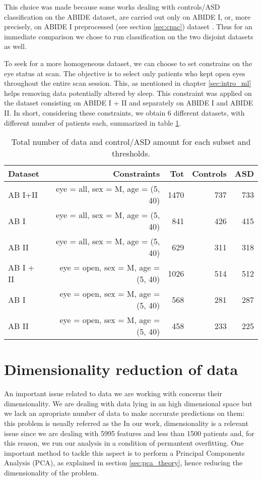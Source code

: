 \documentclass[11pt]{report}
\begin{document}
This choice was made because some works dealing with controls/ASD classification on the ABIDE dataset, are carried out only on ABIDE I, or, more precisely, on ABIDE I preprocessed (see section \ref{sec:cpac}) dataset \cite{spera-2019}. 
Thus for an immediate comparison we chose to run classification on the two disjoint datasets as well.

To seek for a more homogeneous dataset, we can choose to set constrains on the eye status at scan.
The objective is to select only patients who kept open eyes throughout the entire scan session.
This, as mentioned in chapter \ref{sec:intro_ml} helps removing data potentially altered by sleep.
This constraint was applied on the dataset consisting on ABIDE I + II and separately on ABIDE I and ABIDE II.
In short, considering these constraints, we obtain 6 different datasets, with different number of patients each, summarized in table \ref{tab:controlASD_per_subset}.




\begin{table}[!htp]\centering
\scriptsize
\begin{tabular}{lrrrr}\toprule
Dataset &Constraints &Tot &Controls &ASD \\\midrule
AB I+II &eye = all, sex = M, age = (5, 40) &1470 &737 &733 \\
AB I& eye = all, sex = M, age = (5, 40)&841 &426 &415 \\
AB II&eye = all, sex = M, age = (5, 40) &629 &311 &318 \\
AB I + II &eye = open, sex = M, age = (5, 40) &1026 &514 &512 \\
AB I& eye = open, sex = M, age = (5, 40) &568 &281 &287 \\
AB II &eye = open, sex = M, age = (5, 40) &458 &233 &225 \\
\bottomrule
\end{tabular}
\caption{Total number of data and control/ASD amount for each subset and thresholds. }
\label{tab:controlASD_per_subset}
\end{table}


\section{Dimensionality reduction of data}

An important issue related to data we are working with concerns their dimensionality.
We are dealing with data lying in an high dimensional space but we lack an apropriate number of data to make acccurate predictions on them: this problem is usually referred as the 
In our work, dimensionality is a relevant issue since we are dealing with 5995 features and less than 1500 patients and, for this reason, we run our analysis in a condition of permantent overfitting.
One important method to tackle this aspect is to perform a Principal Components Analysis (PCA), as explained in section \ref{sec:pca_theory}, hence reducing the dimensionality of the problem.
\end{document}
